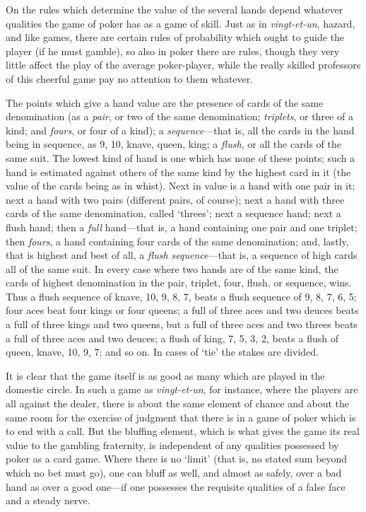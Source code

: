 \documentclass[letterpaper,12pt,oneside,openany]{memoir}
\begin{document}
On the rules which determine the value of the
several hands depend whatever qualities the game of
poker has as a game of skill. Just as in \textit{vingt-et-un},
hazard, and like games, there are certain rules of probability
which ought to guide the player (if he must
gamble), so also in poker there are rules, though they
very little affect the play of the average poker-player,
while the really skilled professors of this cheerful game
pay no attention to them whatever.

The points which give a hand value are the presence
of cards of the same denomination (as a \textit{pair}, or
two of the same denomination; \textit{triplets}, or three of a
kind; and \textit{fours}, or four of a kind); a \textit{sequence}---that is,
all the cards in the hand being in sequence, as 9, 10,
knave, queen, king; a \textit{flush}, or all the cards of the same
suit. The lowest kind of hand is one which has none
of these points; such a hand is estimated against others
of the same kind by the highest card in it (the value of
the cards being as in whist). Next in value is a hand
with one pair in it; next a hand with two pairs (different
pairs, of course); next a hand with three cards of
the same denomination, called `threes'; next a sequence
hand; next a flush hand; then a \textit{full} hand---that is, a
hand containing one pair and one triplet; then \textit{fours},
a hand containing four cards of the same denomination;
and, lastly, that is highest and best of all, a \textit{flush sequence}---that
is, a sequence of high cards all of the same
suit. In every case where two hands are of the same
kind, the cards of highest denomination in the pair,
triplet, four, flush, or sequence, wins. Thus a flush
sequence of knave, 10, 9, 8, 7, beats a flush sequence of
9, 8, 7, 6, 5; four aces beat four kings or four queens;
a full of three aces and two deuces beats a full of three
kings and two queens, but a full of three aces and two
threes beats a full of three aces and two deuces; a flush
of king, 7, 5, 3, 2, beats a flush of queen, knave,
10, 9, 7; and so on. In cases of `tie' the stakes are
divided.

It is clear that the game itself is as good as many
which are played in the domestic circle. In such a
game as \textit{vingt-et-un}, for instance, where the players are
all against the dealer, there is about the same element
of chance and about the same room for the exercise of
judgment that there is in a game of poker which is to end
with a call. But the bluffing element, which is what
gives the game its real value to the gambling fraternity,
is independent of any qualities possessed by poker as a
card game. Where there is no `limit' (that is, no
stated sum beyond which no bet must go), one can bluff
as well, and almost as safely, over a bad hand as over a
good one---if one possesses the requisite qualities of
a false face and a steady nerve.
\end{document}
